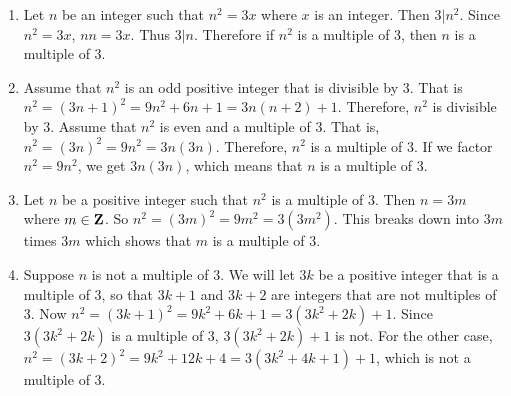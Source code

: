 \documentclass[12pt,letterpaper]{report}
\def\Z{{\bf Z}}
\begin{document}
\begin{enumerate}

\item  Let $n$ be an integer such that $n^2=3x$ where $x$ is an integer. Then $3 | n^2$. Since $n^2 = 3x$,  $nn = 3x$. Thus $3 | n$. Therefore if $n^2$ is a multiple of 3, then $n$ is a multiple of 3.

\item  Assume that $n^2$ is an odd positive integer that is divisible by 3. That is $n^2 = (3n+1)^2 = 9n^2 + 6n +1 = 3n(n+2)+1$. Therefore, $n^2$ is divisible by 3. Assume that $n^2$ is even and a multiple of 3. That is, $n^2 = (3n)^2 = 9n^2 = 3n(3n)$. Therefore, $n^2$ is a multiple of 3. If we factor $n^2 = 9n^2$, we get $3n(3n)$, which means that $n$ is a multiple of 3.

\item  Let $n$ be a positive integer such that $n^2$ is a multiple of 3. Then $n=3m$ where $m \in \Z$. So $n^2 = (3m)^2 = 9 m^2 = 3 (3m^2).$ This breaks down into $3m$ times $3m$ which shows that $m$ is a multiple of 3. 

\item  Suppose $n$ is not a multiple of 3. We will let $3k$ be a positive integer that is a multiple of 3, so that $3k+1$ and $3k+2$ are integers that are not multiples of 3. Now $n^2 = (3k+1)^2 = 9k^2 + 6k +1 = 3(3k^2+2k) + 1$. Since $ 3(3k^2+2k)$ is a multiple of 3, $ 3(3k^2+2k)+1$ is not. For the other case, $n^2 = (3k+2)^2 = 9k^2 + 12k +4 = 3(3k^2+4k+1) + 1$, which is not a multiple of 3. %

\bigskip
\bigskip
\bigskip


\end{enumerate}
\end{document}
